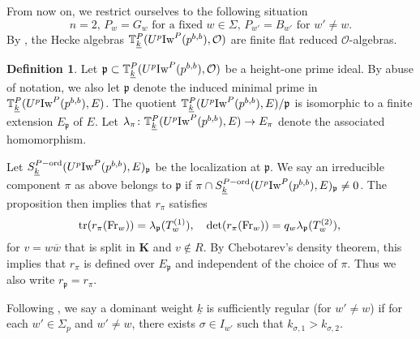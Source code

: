 \documentclass[leqno]{amsart}
\newcommand{\wt}[1]{\underline{ #1 }}
\newcommand{\TT}{\mathbb{T}} %
\newcommand{\Iw}{\textnormal{Iw}}
\newcommand{\bw}{\overline{w}}
\newcommand{\Fr}{\textnormal{Fr}} %
\newcommand{\ord}{\textnormal{ord}}
\DeclareMathOperator{\mtr}{tr}
\newcommand{\K}{{\mathbf{K}}} %
\newcommand{\oo}{\mathcal{O}} %
\newcommand{\fp}{\mathfrak{p}}
\theoremstyle{definition}
\newtheorem{defn}[thm]{Definition}
\theoremstyle{remark}
\begin{document}
From now on,
we restrict ourselves to the following situation
\begin{equation}\label{cond:parabolic}\tag{P}
	n=2,\, 
	P_w=G_w \text{ for a fixed }w\in \Sigma,\,
	P_{w'}=B_{w'} \text{ for } w'\neq w.
\end{equation}
By \cite[Lem 2.14]{ger}, 
the Hecke algebras
$\TT^P_{\wt{k}}(U^p\Iw^P(p^{b,b}),\oo)$
are finite flat reduced $\oo$-algebras.
\begin{defn}\label{def:rep_prime}
	Let $\fp\subset \TT^P_{\wt{k}}(U^p\Iw^P(p^{b,b}),\oo)$
	be a height-one prime ideal.
	By abuse of notation, 
	we also let $\fp$ denote the induced minimal prime
	in $\TT^P_{\wt{k}}(U^p\Iw^P(p^{b,b}),E)$.
	The quotient $\TT^P_{\wt{k}}(U^p\Iw^P(p^{b,b}),E)/\fp$
	is isomorphic to a finite extension $E_{\fp}$ of $E$.
	Let 
	$\lambda_\pi\colon \TT^P_{\wt{k}}(U^p\Iw^P(p^{b,b}),E)\to E_\pi$
	denote the associated homomorphism.

	Let $S_{\wt{k}}^{P-\ord}(U^p\Iw^P(p^{b,b}),E)_{\fp}$
	be the localization at $\fp$.
	We say an irreducible component $\pi$ as above
	belongs to  $\fp$ if 
	$\pi\cap S_{\wt{k}}^{P-\ord}(U^p\Iw^P(p^{b,b}),E)_{\fp}\neq 0$.
	The proposition then implies that
	$r_\pi$ satisfies
	\begin{equation}\label{eq:Gal_hecke_away_p}
		\mtr(r_\pi(\Fr_w))=\lambda_\fp(T_w^{(1)}),\quad
		\det(r_\pi(\Fr_w))=q_w\lambda_\fp(T_w^{(2)}),\,
	\end{equation}
	for $v=w\bw$ that is split in  $\K$ and $v\notin R$. 
	By Chebotarev's density theorem,
	this implies that $r_\pi$ is defined over  $E_{\fp}$
	and independent of the choice of $\pi$.
	Thus we also write $r_\fp=r_\pi$.
\end{defn}




Following \cite{ger},
we say a dominant weight $\wt{k}$ is sufficiently regular
(for $w'\neq w$)
if for each $w'\in \Sigma_p$  and $w'\neq w$,
there exists  $\sigma\in I_{w'}$
such that  $k_{\sigma,1}>k_{\sigma,2}$.
\end{document}
